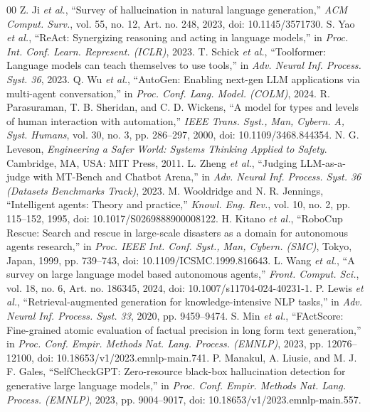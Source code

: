 \documentclass[conference]{IEEEtran}
\begin{document}
\balance
\begin{thebibliography}{00}
 Z. Ji \textit{et al.}, ``Survey of hallucination in natural language generation,'' \textit{ACM Comput. Surv.}, vol. 55, no. 12, Art. no. 248, 2023, doi: 10.1145/3571730.
 S. Yao \textit{et al.}, ``ReAct: Synergizing reasoning and acting in language models,'' in \textit{Proc. Int. Conf. Learn. Represent. (ICLR)}, 2023.
 T. Schick \textit{et al.}, ``Toolformer: Language models can teach themselves to use tools,'' in \textit{Adv. Neural Inf. Process. Syst. 36}, 2023.
 Q. Wu \textit{et al.}, ``AutoGen: Enabling next-gen LLM applications via multi-agent conversation,'' in \textit{Proc. Conf. Lang. Model. (COLM)}, 2024.
 R. Parasuraman, T. B. Sheridan, and C. D. Wickens, ``A model for types and levels of human interaction with automation,'' \textit{IEEE Trans. Syst., Man, Cybern. A, Syst. Humans}, vol. 30, no. 3, pp. 286--297, 2000, doi: 10.1109/3468.844354.
 N. G. Leveson, \textit{Engineering a Safer World: Systems Thinking Applied to Safety}. Cambridge, MA, USA: MIT Press, 2011.
 L. Zheng \textit{et al.}, ``Judging LLM-as-a-judge with MT-Bench and Chatbot Arena,'' in \textit{Adv. Neural Inf. Process. Syst. 36 (Datasets Benchmarks Track)}, 2023.
 M. Wooldridge and N. R. Jennings, ``Intelligent agents: Theory and practice,'' \textit{Knowl. Eng. Rev.}, vol. 10, no. 2, pp. 115--152, 1995, doi: 10.1017/S0269888900008122.
 H. Kitano \textit{et al.}, ``RoboCup Rescue: Search and rescue in large-scale disasters as a domain for autonomous agents research,'' in \textit{Proc. IEEE Int. Conf. Syst., Man, Cybern. (SMC)}, Tokyo, Japan, 1999, pp. 739--743, doi: 10.1109/ICSMC.1999.816643.
 L. Wang \textit{et al.}, ``A survey on large language model based autonomous agents,'' \textit{Front. Comput. Sci.}, vol. 18, no. 6, Art. no. 186345, 2024, doi: 10.1007/s11704-024-40231-1.
 P. Lewis \textit{et al.}, ``Retrieval-augmented generation for knowledge-intensive NLP tasks,'' in \textit{Adv. Neural Inf. Process. Syst. 33}, 2020, pp. 9459--9474.
 S. Min \textit{et al.}, ``FActScore: Fine-grained atomic evaluation of factual precision in long form text generation,'' in \textit{Proc. Conf. Empir. Methods Nat. Lang. Process. (EMNLP)}, 2023, pp. 12076--12100, doi: 10.18653/v1/2023.emnlp-main.741.
 P. Manakul, A. Liusie, and M. J. F. Gales, ``SelfCheckGPT: Zero-resource black-box hallucination detection for generative large language models,'' in \textit{Proc. Conf. Empir. Methods Nat. Lang. Process. (EMNLP)}, 2023, pp. 9004--9017, doi: 10.18653/v1/2023.emnlp-main.557.

\end{thebibliography}
\end{document}
